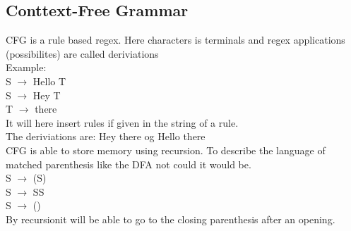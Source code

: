 \documentclass[12pt, a4paper]{article}
\begin{document}
			\subsection{Conttext-Free Grammar}
				CFG is a rule based regex. Here characters is terminals and regex applications (possibilites) are called deriviations\\
				Example:\\
				S $\rightarrow$ Hello T\\
				S $\rightarrow$ Hey T\\
				T $\rightarrow$ there\\
				It will here insert rules if given in the string of a rule.\\
				The deriviations are: Hey there og Hello there\\[4mm]
				CFG is able to store memory using recursion. To describe the language of matched parenthesis like the DFA not could it would be.\\
				S $\rightarrow$ (S)\\
				S $\rightarrow$ SS\\
				S $\rightarrow$ ()\\
				By recursionit will be able to go to the closing parenthesis after an opening.
		
\end{document}
